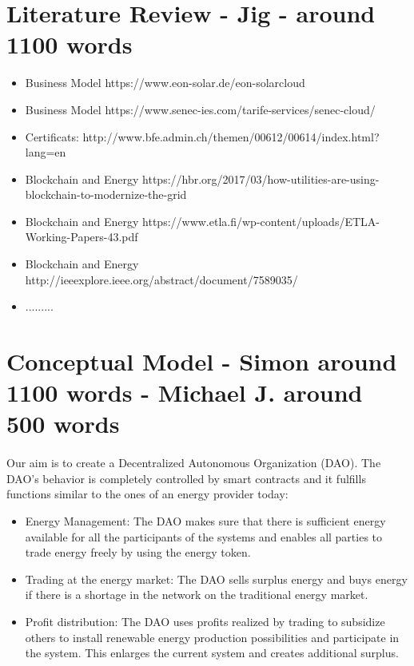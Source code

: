 \documentclass{scrartcl}
\begin{document}
	\section{Literature Review - Jig - around 1100 words}
    
    \begin{itemize}
    \item Business Model https://www.eon-solar.de/eon-solarcloud
    \item Business Model https://www.senec-ies.com/tarife-services/senec-cloud/
    \item Certificats: http://www.bfe.admin.ch/themen/00612/00614/index.html?lang=en
    \item Blockchain and Energy https://hbr.org/2017/03/how-utilities-are-using-blockchain-to-modernize-the-grid
    \item Blockchain and Energy https://www.etla.fi/wp-content/uploads/ETLA-Working-Papers-43.pdf
    \item Blockchain and Energy http://ieeexplore.ieee.org/abstract/document/7589035/
    \item .........
    \end{itemize}
	
	\section{Conceptual Model - Simon around 1100 words - Michael J. around 500 words}

    \paragraph{}
    Our aim is to create a Decentralized Autonomous Organization (DAO). The DAO's behavior is completely controlled by smart contracts and it fulfills functions similar to the ones of an energy provider today:
   
	\begin{itemize}
		\item Energy Management: The DAO makes sure that there is sufficient energy available for all the participants of the systems and enables all parties to trade energy freely by using the energy token.
		\item Trading at the energy market: The DAO sells surplus energy and buys energy if there is a shortage in the network on the traditional energy market.
		\item Profit distribution: The DAO uses profits realized by trading to subsidize others to install renewable energy production possibilities and participate in the system. This enlarges the current system and creates additional surplus.
	\end{itemize}
\end{document}
